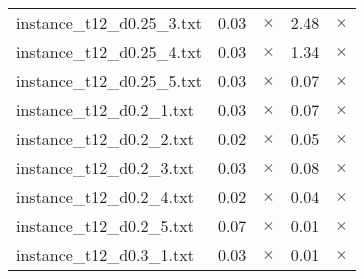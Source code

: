 \documentclass{article}
\begin{document}
\begin{center}
\begin{tabular}{lrrrr}
instance\_t12\_d0.25\_3.txt & 0.03 & 
$\times$
 & 2.48 & 
$\times$
\\
instance\_t12\_d0.25\_4.txt & 0.03 & 
$\times$
 & 1.34 & 
$\times$
\\
instance\_t12\_d0.25\_5.txt & 0.03 & 
$\times$
 & 0.07 & 
$\times$
\\
instance\_t12\_d0.2\_1.txt & 0.03 & 
$\times$
 & 0.07 & 
$\times$
\\
instance\_t12\_d0.2\_2.txt & 0.02 & 
$\times$
 & 0.05 & 
$\times$
\\
instance\_t12\_d0.2\_3.txt & 0.03 & 
$\times$
 & 0.08 & 
$\times$
\\
instance\_t12\_d0.2\_4.txt & 0.02 & 
$\times$
 & 0.04 & 
$\times$
\\
instance\_t12\_d0.2\_5.txt & 0.07 & 
$\times$
 & 0.01 & 
$\times$
\\
instance\_t12\_d0.3\_1.txt & 0.03 & 
$\times$
 & 0.01 & 
$\times$
\\
\hline\end{tabular}
\end{center}
\end{document}
